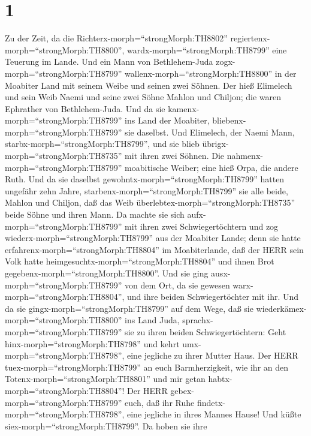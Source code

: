 \hypertarget{section}{%
\section{1}\label{section}}

 Zu der Zeit, da die Richterx-morph=``strongMorph:TH8802''
regiertenx-morph=``strongMorph:TH8800'',
wardx-morph=``strongMorph:TH8799'' eine Teuerung im Lande. Und ein Mann
von Bethlehem-Juda zogx-morph=``strongMorph:TH8799''
wallenx-morph=``strongMorph:TH8800'' in der Moabiter Land mit seinem
Weibe und seinen zwei Söhnen.  Der hieß Elimelech und sein
Weib Naemi und seine zwei Söhne Mahlon und Chiljon; die waren Ephrather
von Bethlehem-Juda. Und da sie kamenx-morph=``strongMorph:TH8799'' ins
Land der Moabiter, bliebenx-morph=``strongMorph:TH8799'' sie daselbst.
 Und Elimelech, der Naemi Mann,
starbx-morph=``strongMorph:TH8799'', und sie blieb
übrigx-morph=``strongMorph:TH8735'' mit ihren zwei Söhnen. 
Die nahmenx-morph=``strongMorph:TH8799'' moabitische Weiber; eine hieß
Orpa, die andere Ruth. Und da sie daselbst
gewohntx-morph=``strongMorph:TH8799'' hatten ungefähr zehn Jahre,
 starbenx-morph=``strongMorph:TH8799'' sie alle beide,
Mahlon und Chiljon, daß das Weib überlebtex-morph=``strongMorph:TH8735''
beide Söhne und ihren Mann.  Da machte sie sich
aufx-morph=``strongMorph:TH8799'' mit ihren zwei Schwiegertöchtern und
zog wiederx-morph=``strongMorph:TH8799'' aus der Moabiter Lande; denn
sie hatte erfahrenx-morph=``strongMorph:TH8804'' im Moabiterlande, daß
der HERR sein Volk hatte heimgesuchtx-morph=``strongMorph:TH8804'' und
ihnen Brot gegebenx-morph=``strongMorph:TH8800''.  Und sie
ging ausx-morph=``strongMorph:TH8799'' von dem Ort, da sie gewesen
warx-morph=``strongMorph:TH8804'', und ihre beiden Schwiegertöchter mit
ihr. Und da sie gingx-morph=``strongMorph:TH8799'' auf dem Wege, daß sie
wiederkämex-morph=``strongMorph:TH8800'' ins Land Juda, 
sprachx-morph=``strongMorph:TH8799'' sie zu ihren beiden
Schwiegertöchtern: Geht hinx-morph=``strongMorph:TH8798'' und kehrt
umx-morph=``strongMorph:TH8798'', eine jegliche zu ihrer Mutter Haus.
Der HERR tuex-morph=``strongMorph:TH8799'' an euch Barmherzigkeit, wie
ihr an den Totenx-morph=``strongMorph:TH8801'' und mir getan
habtx-morph=``strongMorph:TH8804''!  Der HERR
gebex-morph=``strongMorph:TH8799'' euch, daß ihr Ruhe
findetx-morph=``strongMorph:TH8798'', eine jegliche in ihres Mannes
Hause! Und küßte siex-morph=``strongMorph:TH8799''. Da hoben sie ihre
